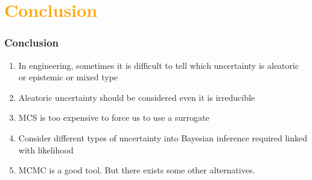 \section{\textcolor{orange}{Conclusion}}
\begin{frame}
\frametitle{Conclusion}

\begin{enumerate}
\setlength\itemsep{1em}
    \item In engineering, sometimes it is difficult to tell which uncertainty is \alert{aleatoric} or \alert{epistemic} or \alert{mixed type}

    \item \alert{Aleatoric} uncertainty should be considered even it is \alert{irreducible}

    \item MCS is too expensive to force us to use a \alert{surrogate}

    \item Consider different types of uncertainty into Bayesian inference required \alert{linked with likelihood}

    \item MCMC is a good tool. But there exists some other alternatives.  
\end{enumerate}

    
\end{frame}





